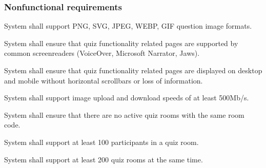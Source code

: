 \subsubsection{Nonfunctional requirements}


\begin{nfrlist}
    \item System shall support PNG, SVG, JPEG, WEBP, GIF question image formats.
    \item System shall ensure that quiz functionality related pages are supported by common screenreaders (VoiceOver, Microsoft Narrator, Jaws).
    \item System shall ensure that quiz functionality related pages are displayed on desktop and mobile without horizontal scrollbars or loss of information.
    \item System shall support image upload and download speeds of at least 500Mb/s.
    \item System shall ensure that there are no active quiz rooms with the same room code.
    \item System shall support at least 100 participants in a quiz room.
    \item System shall support at least 200 quiz rooms at the same time.
\end{nfrlist}
